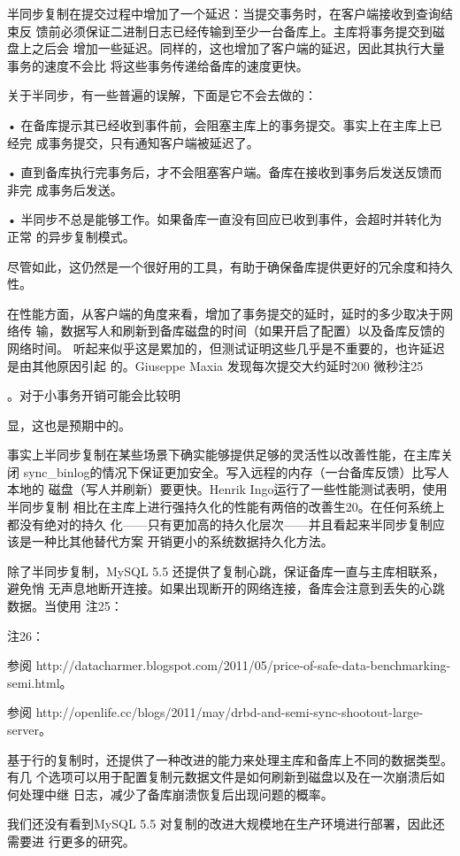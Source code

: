 半同步复制在提交过程中增加了一个延迟：当提交事务时，在客户端接收到查询结束反
馈前必须保证二进制日志已经传输到至少一台备库上。主库将事务提交到磁盘上之后会
增加一些延迟。同样的，这也增加了客户端的延迟，因此其执行大量事务的速度不会比
将这些事务传递给备库的速度更快。

关于半同步，有一些普遍的误解，下面是它不会去做的：

• 在备库提示其已经收到事件前，会阻塞主库上的事务提交。事实上在主库上已经完
成事务提交，只有通知客户端被延迟了。

• 直到备库执行完事务后，才不会阻塞客户端。备库在接收到事务后发送反馈而非完
成事务后发送。

• 半同步不总是能够工作。如果备库一直没有回应已收到事件，会超时并转化为正常
的异步复制模式。

尽管如此，这仍然是一个很好用的工具，有助于确保备库提供更好的冗余度和持久性。

在性能方面，从客户端的角度来看，增加了事务提交的延时，延时的多少取决于网络传
输，数据写人和刷新到备库磁盘的时间（如果开启了配置）以及备库反馈的网络时间。
听起来似乎这是累加的，但测试证明这些几乎是不重要的，也许延迟是由其他原因引起
的。Giuseppe Maxia 发现每次提交大约延时200 微秒注25

。对于小事务开销可能会比较明

显，这也是预期中的。

事实上半同步复制在某些场景下确实能够提供足够的灵活性以改善性能，在主库关闭
sync\_binlog的情况下保证更加安全。写入远程的内存（一台备库反馈）比写人本地的
磁盘（写人并刷新）要更快。Henrik Ingo运行了一些性能测试表明，使用半同步复制
相比在主库上进行强持久化的性能有两倍的改善生20。在任何系统上都没有绝对的持久
化——只有更加高的持久化层次——并且看起来半同步复制应该是一种比其他替代方案
开销更小的系统数据持久化方法。

除了半同步复制，MySQL 5.5 还提供了复制心跳，保证备库一直与主库相联系，避免悄
无声息地断开连接。如果出现断开的网络连接，备库会注意到丢失的心跳数据。当使用
注25：

注26：

参阅 http://datacharmer.blogspot.com/2011/05/price-of-safe-data-benchmarking-semi.html。

参阅 http://openlife.cc/blogs/2011/may/drbd-and-semi-sync-shootout-large-server。

基于行的复制时，还提供了一种改进的能力来处理主库和备库上不同的数据类型。有几
个选项可以用于配置复制元数据文件是如何刷新到磁盘以及在一次崩溃后如何处理中继
日志，减少了备库崩溃恢复后出现问题的概率。

我们还没有看到MySQL 5.5 对复制的改进大规模地在生产环境进行部署，因此还需要进
行更多的研究。

